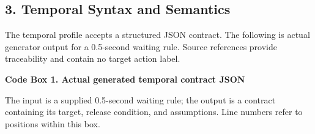 \documentclass[11pt,a4paper]{article}
\begin{document}
\subsection*{3. Temporal Syntax and Semantics}

The temporal profile accepts a structured JSON contract. The following is actual generator output for a 0.5-second waiting rule. Source references provide traceability and contain no target action label.\par

\par\medskip\noindent\begin{minipage}{\linewidth}
\textbf{Code Box 1. Actual generated temporal contract JSON}\par

The input is a supplied 0.5-second waiting rule; the output is a contract containing its target, release condition, and assumptions. Line numbers refer to positions within this box.\par


\end{minipage}
\end{document}
